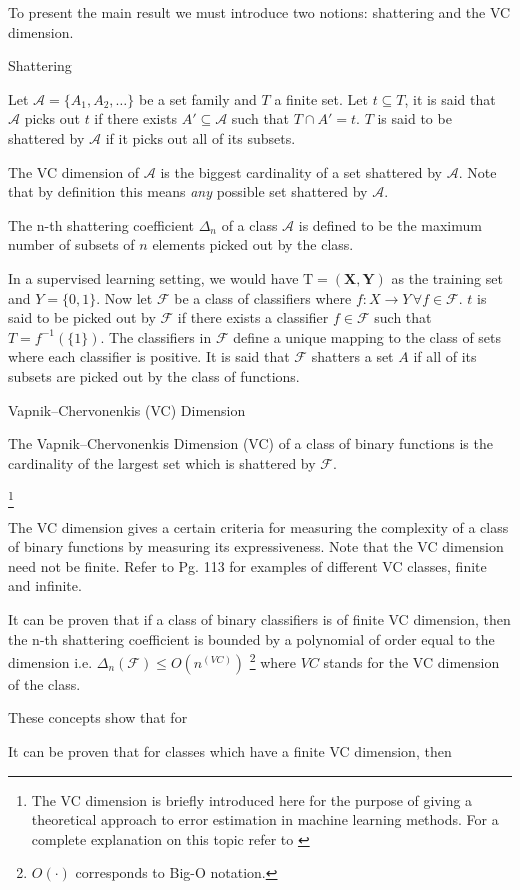 To present the main result we must introduce two notions:
shattering and the VC dimension.

\begin{definition}{Shattering}

Let $\mathcal {A}= \{A_1,A_{2},\dots \}$ be a set family and $T$ a finite set. Let $t \subseteq T$, it is said that $\mathcal {A}$ picks out $t$ if there exists $A' \subseteq \mathcal {A} $ such that $ T \cap A' = t$. $T$ is said to be shattered by $\mathcal {A}$ if it picks out all of its subsets.

The VC dimension of $\mathcal {A}$ is the biggest cardinality of a set shattered by $\mathcal {A}$. Note that by definition this means \textit{any} possible set shattered by $\mathcal {A}$.
\end{definition}
 
The n-th shattering coefficient $\Delta_n$ of a class $\mathcal {A}$ is defined to be the maximum number of subsets of $n$ elements picked out by the class. 

In a supervised learning setting, we would have $\mathrm{T} = (\textbf{X},\textbf{Y})$ as the training set and $Y = \{0,1 \}$. Now let $\mathcal {F}$ be a class of classifiers where $f: X \rightarrow Y \, \forall f \in \mathcal {F}$. $t$ is said to be picked out by $\mathcal {F}$ if there exists a classifier $f \in \mathcal {F}$ such that $T = f^{-1}(\{1\})$. The classifiers in $\mathcal {F}$ define a unique mapping to the class of sets where each classifier is positive. It is said that $\mathcal {F}$ shatters a set $A$ if all of its subsets are picked out by the class of functions.

\begin{definition}{Vapnik–Chervonenkis (VC) Dimension}
 	
The Vapnik–Chervonenkis Dimension (VC) of a class of binary functions is the cardinality of the largest set which is shattered by $\mathcal {F}$.
\end{definition}\footnote{The VC dimension is briefly introduced here for the purpose of giving a theoretical approach to error estimation in machine learning methods. For a complete explanation on this topic refer to \cite{vapnik-nature2013}}

The VC dimension gives a certain criteria for measuring the complexity of a class of binary functions by measuring its expressiveness. Note that the VC dimension need not be finite. Refer to \cite{cherkassky-learning2007} Pg. 113 for examples of different VC classes, finite and infinite.

It can be proven that if a class of binary classifiers is of finite VC dimension, then the n-th shattering coefficient is bounded by a polynomial of order equal to the dimension 
i.e. $\Delta_n(\mathcal {F}) \leq O(n^(VC))$ \footnote{$O(\cdot)$ corresponds to Big-O notation.} where $VC$ stands for the VC dimension of the class.

These concepts show that for

It can be proven that for classes which have a finite VC dimension, then

